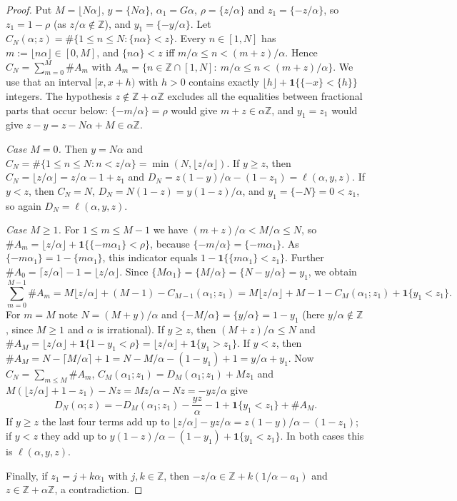 \documentclass[11pt]{amsart}
\theoremstyle{definition}
\numberwithin{equation}{section}
\newcommand{\Z}{\mathbb{Z}}
\newcommand{\fr}[1]{\{#1\}}
\newcommand{\ind}{\mathbf{1}}
\begin{document}
\begin{proof}
Put $M=\lfloor N\alpha\rfloor$, $y=\fr{N\alpha}$, $\alpha_1=G\alpha$, $\rho=\fr{z/\alpha}$ and $z_1=\fr{-z/\alpha}$, so $z_1=1-\rho$ (as
$z/\alpha\notin\Z$), and $y_1=\fr{-y/\alpha}$. Let $C_N(\alpha;z)=\#\{1\le n\le N:\fr{n\alpha}<z\}$. Every $n\in[1,N]$ has $m:=\lfloor n\alpha\rfloor\in[0,M]$,
and $\fr{n\alpha}<z$ iff $m/\alpha\le n<(m+z)/\alpha$. Hence $C_N=\sum_{m=0}^M\#A_m$ with
$A_m=\{n\in\Z\cap[1,N]:\ m/\alpha\le n<(m+z)/\alpha\}$. We use that an interval $[x,x+h)$ with $h>0$ contains exactly
$\lfloor h\rfloor+\ind\{\fr{-x}<\fr{h}\}$ integers. The hypothesis $z\notin\Z+\alpha\Z$ excludes all the equalities between fractional parts that
occur below: $\fr{-m/\alpha}=\rho$ would give $m+z\in\alpha\Z$, and $y_1=z_1$ would give $z-y=z-N\alpha+M\in\alpha\Z$.

\emph{Case $M=0$.} Then $y=N\alpha$ and $C_N=\#\{1\le n\le N: n<z/\alpha\}=\min(N,\lfloor z/\alpha\rfloor)$. If $y\ge z$, then
$C_N=\lfloor z/\alpha\rfloor=z/\alpha-1+z_1$ and $D_N=z(1-y)/\alpha-(1-z_1)=\ell(\alpha,y,z)$. If $y<z$, then $C_N=N$, $D_N=N(1-z)=y(1-z)/\alpha$,
and $y_1=\fr{-N}=0<z_1$, so again $D_N=\ell(\alpha,y,z)$.

\emph{Case $M\ge1$.} For $1\le m\le M-1$ we have $(m+z)/\alpha<M/\alpha\le N$, so $\#A_m=\lfloor z/\alpha\rfloor+\ind\{\fr{-m\alpha_1}<\rho\}$, because
$\fr{-m/\alpha}=\fr{-m\alpha_1}$. As $\fr{-m\alpha_1}=1-\fr{m\alpha_1}$, this indicator equals $1-\ind\{\fr{m\alpha_1}<z_1\}$. Further
$\#A_0=\lceil z/\alpha\rceil-1=\lfloor z/\alpha\rfloor$. Since $\fr{M\alpha_1}=\fr{M/\alpha}=\fr{N-y/\alpha}=y_1$, we obtain
\[
\sum_{m=0}^{M-1}\#A_m=M\lfloor z/\alpha\rfloor+(M-1)-C_{M-1}(\alpha_1;z_1)=M\lfloor z/\alpha\rfloor+M-1-C_M(\alpha_1;z_1)+\ind\{y_1<z_1\}.
\]
For $m=M$ note $N=(M+y)/\alpha$ and $\fr{-M/\alpha}=\fr{y/\alpha}=1-y_1$ (here $y/\alpha\notin\Z$, since $M\ge1$ and $\alpha$ is irrational). If $y\ge z$,
then $(M+z)/\alpha\le N$ and $\#A_M=\lfloor z/\alpha\rfloor+\ind\{1-y_1<\rho\}=\lfloor z/\alpha\rfloor+\ind\{y_1>z_1\}$. If $y<z$, then
$\#A_M=N-\lceil M/\alpha\rceil+1=N-M/\alpha-(1-y_1)+1=y/\alpha+y_1$. Now $C_N=\sum_{m\le M}\#A_m$, $C_M(\alpha_1;z_1)=D_M(\alpha_1;z_1)+Mz_1$ and
$M(\lfloor z/\alpha\rfloor+1-z_1)-Nz=Mz/\alpha-Nz=-yz/\alpha$ give
\[
D_N(\alpha;z)=-D_M(\alpha_1;z_1)-\frac{yz}{\alpha}-1+\ind\{y_1<z_1\}+\#A_M .
\]
If $y\ge z$ the last four terms add up to $\lfloor z/\alpha\rfloor-yz/\alpha=z(1-y)/\alpha-(1-z_1)$; if $y<z$ they add up to
$y(1-z)/\alpha-(1-y_1)+\ind\{y_1<z_1\}$. In both cases this is $\ell(\alpha,y,z)$.

Finally, if $z_1=j+k\alpha_1$ with $j,k\in\Z$, then $-z/\alpha\in\Z+k(1/\alpha-a_1)$ and $z\in\Z+\alpha\Z$, a contradiction.
\end{proof}
\end{document}
